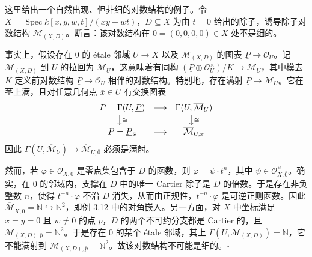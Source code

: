 \begin{example}
这里给出一个自然出现、但非细的对数结构的例子。令 $X=\operatorname{Spec} k[x,y,w,t]/(xy-wt)$，$D\subseteq X$ 为由 $t=0$ 给出的除子，诱导除子对数结构 $\mathcal{M}_{(X,D)}$。断言：该对数结构在 $0=(0,0,0,0)\in X$ 处不是细的。

事实上，假设存在 $0$ 的 étale 邻域 $U\to X$ 以及 $\mathcal{M}_{(X,D)}$ 的图表 $\underline{P}\to\mathcal{O}_U$。记 $\mathcal{M}_{(X,D)}$ 到 $U$ 的拉回为 $\mathcal{M}_U$，这意味着有同构 $(\underline{P}\oplus\mathcal{O}_U^{\times})/K\to\mathcal{M}_U$，其中模去 $K$ 定义前对数结构 $\underline{P}\to\mathcal{O}_U$ 相伴的对数结构。特别地，存在满射 $\underline{P}\to\overline{\mathcal{M}}_U$。它在茎上满，且对任意几何点 $\bar x\in U$ 有交换图表
\[
\begin{array}{ccc}
  P=\Gamma(U,\underline{P}) & \longrightarrow & \Gamma(U,\overline{\mathcal{M}}_U)\\[2pt]
  \big\downarrow\scriptstyle{\cong} & & \big\downarrow\scriptstyle{\cong}\\[2pt]
  P=\underline{P}_{\bar x} & \longrightarrow & \overline{\mathcal{M}}_{U,\bar x}
\end{array}
\]
因此 $\Gamma(U,\overline{\mathcal{M}}_U)\to\overline{\mathcal{M}}_{U,\bar 0}$ 必须是满射。

然而，若 $\varphi\in\mathcal{O}_{X,\bar 0}$ 是零点集包含于 $D$ 的函数，则 $\varphi=\psi\cdot t^n$，其中 $\psi\in\mathcal{O}_{X,\bar 0}^{\times}$。确实，在 $0$ 的邻域内，支撑在 $D$ 中的唯一 Cartier 除子是 $D$ 的倍数。于是存在非负整数 $n$，使得 $t^{-n}\cdot\varphi$ 不沿 $D$ 消失，从而由正规性，$t^{-n}\cdot\varphi$ 是可逆正则函数。因此 $\overline{\mathcal{M}}_{X,\bar 0}=\mathbb{N}\hookrightarrow\mathbb{N}^2$，即例 3.12 中的对角嵌入。另一方面，对 $X$ 中坐标满足 $x=y=0$ 且 $w\neq0$ 的点 $p$，$D$ 的两个不可约分支都是 Cartier 的，且 $\overline{\mathcal{M}}_{(X,D),\bar p}=\mathbb{N}^2$。于是存在 $0$ 的某个 étale 邻域，其上 $\Gamma(U,\overline{\mathcal{M}}_{(X,D)})=\mathbb{N}$，它不能满射到 $\overline{\mathcal{M}}_{(X,D),\bar p}=\mathbb{N}^2$。故该对数结构不可能是细的。\hfill$\square$
\end{example}



